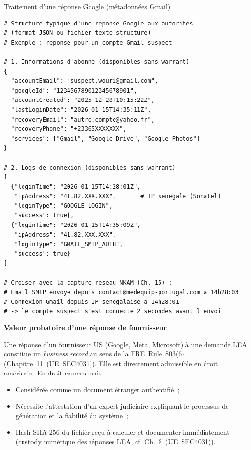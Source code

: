 \begin{boxoutils}{Traitement d'une réponse Google (métadonnées Gmail)}
\begin{lstlisting}[language=bash_forensique]
# Structure typique d'une reponse Google aux autorites
# (format JSON ou fichier texte structure)
# Exemple : reponse pour un compte Gmail suspect

# 1. Informations d'abonne (disponibles sans warrant)
{
  "accountEmail": "suspect.wouri@gmail.com",
  "googleId": "123456789012345678901",
  "accountCreated": "2025-12-28T10:15:22Z",
  "lastLoginDate": "2026-01-15T14:35:11Z",
  "recoveryEmail": "autre.compte@yahoo.fr",
  "recoveryPhone": "+23365XXXXXXX",
  "services": ["Gmail", "Google Drive", "Google Photos"]
}

# 2. Logs de connexion (disponibles sans warrant)
[
  {"loginTime": "2026-01-15T14:28:01Z",
   "ipAddress": "41.82.XXX.XXX",       # IP senegale (Sonatel)
   "loginType": "GOOGLE_LOGIN",
   "success": true},
  {"loginTime": "2026-01-15T14:35:09Z",
   "ipAddress": "41.82.XXX.XXX",
   "loginType": "GMAIL_SMTP_AUTH",
   "success": true}
]

# Croiser avec la capture reseau NKAM (Ch. 15) :
# Email SMTP envoye depuis contact@medequip-portugal.com a 14h28:03
# Connexion Gmail depuis IP senegalaise a 14h28:01
# -> le compte suspect s'est connecte 2 secondes avant l'envoi
\end{lstlisting}
\end{boxoutils}

\begin{boxjuris}
\textbf{Valeur probatoire d'une réponse de fournisseur}

Une réponse d'un fournisseur US (Google, Meta, Microsoft) à une
demande LEA constitue un \textit{business record} au sens de la
FRE~Rule~803(6) (Chapitre~11~(UE~SEC4031)). Elle est directement
admissible en droit américain. En droit camerounais~:
\begin{itemize}
    \item Considérée comme un document étranger authentifié~;
    \item Nécessite l'attestation d'un expert judiciaire expliquant
          le processus de génération et la fiabilité du système~;
    \item Hash SHA-256 du fichier reçu à calculer et documenter
          immédiatement (custody numérique des réponses LEA,
          cf. Ch.~8~(UE~SEC4031)).
\end{itemize}
\end{boxjuris}

